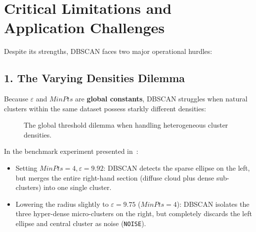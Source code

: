 \section{Critical Limitations and Application Challenges}
\label{sec:dm-dbscan-limitations}

Despite its strengths, DBSCAN faces two major operational hurdles:

\subsection{1. The Varying Densities Dilemma}

Because $\varepsilon$ and $MinPts$ are \textbf{global constants}, DBSCAN struggles when natural clusters within the same dataset possess starkly different densities:

\begin{figure}[htbp]
\centering
{}
\caption{The global threshold dilemma when handling heterogeneous cluster densities.}
\label{fig:dm-dbscan-varying-densities-dilemma}
\end{figure}

In the benchmark experiment presented in~\cite{tan2018}:
\begin{itemize}
    \item Setting $MinPts = 4, \varepsilon = 9.92$: DBSCAN detects the sparse ellipse on the left, but merges the entire right-hand section (diffuse cloud plus dense sub-clusters) into one single cluster.
    \item Lowering the radius slightly to $\varepsilon = 9.75$ ($MinPts = 4$): DBSCAN isolates the three hyper-dense micro-clusters on the right, but completely discards the left ellipse and central cluster as noise (\texttt{NOISE}).
\end{itemize}

